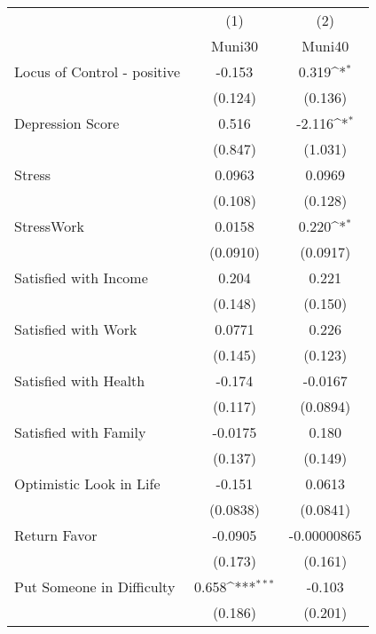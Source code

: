 {
\def\sym#1{\ifmmode^{#1}\else\(^{#1}\)\fi}
\begin{tabular}{l*{2}{c}}
\hline\hline
            &\multicolumn{1}{c}{(1)}&\multicolumn{1}{c}{(2)}\\
            &\multicolumn{1}{c}{Muni30}&\multicolumn{1}{c}{Muni40}\\
\hline
Locus of Control - positive&      -0.153         &       0.319\sym{*}  \\
            &     (0.124)         &     (0.136)         \\
[1em]
Depression Score&       0.516         &      -2.116\sym{*}  \\
            &     (0.847)         &     (1.031)         \\
[1em]
Stress      &      0.0963         &      0.0969         \\
            &     (0.108)         &     (0.128)         \\
[1em]
StressWork  &      0.0158         &       0.220\sym{*}  \\
            &    (0.0910)         &    (0.0917)         \\
[1em]
Satisfied with Income&       0.204         &       0.221         \\
            &     (0.148)         &     (0.150)         \\
[1em]
Satisfied with Work&      0.0771         &       0.226         \\
            &     (0.145)         &     (0.123)         \\
[1em]
Satisfied with Health&      -0.174         &     -0.0167         \\
            &     (0.117)         &    (0.0894)         \\
[1em]
Satisfied with Family&     -0.0175         &       0.180         \\
            &     (0.137)         &     (0.149)         \\
[1em]
Optimistic Look in Life&      -0.151         &      0.0613         \\
            &    (0.0838)         &    (0.0841)         \\
[1em]
Return Favor&     -0.0905         & -0.00000865         \\
            &     (0.173)         &     (0.161)         \\
[1em]
Put Someone in Difficulty&       0.658\sym{***}&      -0.103         \\
            &     (0.186)         &     (0.201)         \\

\end{tabular}}
